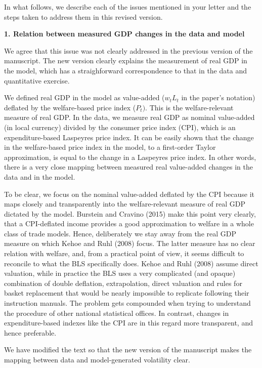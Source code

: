 \documentclass[12pt]{article}
\begin{document}
In what follows, we describe each of the issues mentioned in your letter and
the steps taken to address them in this revised version.\bigskip

\textbf{1. Relation between measured GDP changes in the data and model}

We agree that this issue was not clearly addressed in the previous version
of the manuscript. The new version clearly explains the measurement of real
GDP in the model, which has a straighforward correspondence to that in the
data and quantitative exercise.

We defined real GDP in the model as value-added ($w_{t}L_{t}$ in the paper's
notation) deflated by the welfare-based price index ($P_{t})$. This is the
welfare-relevant measure of real GDP. In the data, we measure real GDP as
nominal value-added (in local currency) divided by the consumer price index
(CPI), which is an expenditure-based Laspeyres price index. It can be easily
shown that the change in the welfare-based price index in the model, to a
first-order Taylor approximation, is equal to the change in a Laspeyres
price index. In other words, there is a very close mapping between measured
real value-added changes in the data and in the model.

To be clear, we focus on the nominal value-added deflated by the CPI because
it maps closely and transparently into the welfare-relevant measure of real
GDP dictated by the model. Burstein and Cravino (2015) make this point very clearly, that a CPI-deflated income provides a good approximation to welfare in a whole class of trade models.
Hence, deliberately we stay away from the real
GDP measure on which Kehoe and Ruhl (2008) focus. The latter measure has no
clear relation with welfare, and, from a practical point of view, it seems difficult to reconcile to what the BLS specifically does. Kehoe and Ruhl (2008)
assume direct valuation, while in practice the BLS uses a very complicated
(and opaque) combination of double deflation, extrapolation, direct
valuation and rules for basket replacement that would be nearly impossible
to replicate following their instruction manuals. The problem gets
compounded when trying to understand the procedure of other national
statistical offices. In contrast, changes in expenditure-based indexes like
the CPI are in this regard more transparent, and hence preferable.

We have modified the text so that the new version of the manuscript makes
the mapping between data and model-generated volatility clear.
\end{document}

